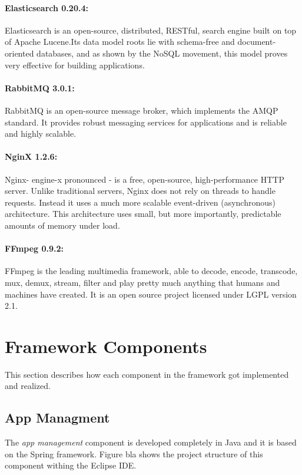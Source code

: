 \paragraph{Elasticsearch 0.20.4:} Elasticsearch is an open-source, distributed, RESTful, search engine built on top of Apache Lucene.Its data model roots lie with schema-free and document-oriented databases, and as shown by the NoSQL movement, this model proves very effective for building applications.

\paragraph{RabbitMQ 3.0.1:} RabbitMQ is an open-source message broker, which implements the AMQP standard. It provides  robust messaging services for applications and is reliable and highly scalable.

\paragraph{NginX 1.2.6:} Nginx- engine-x pronounced - is a free, open-source, high-performance HTTP server. Unlike traditional servers, Nginx does not rely on threads to handle requests. Instead it uses a much more scalable event-driven (asynchronous) architecture. This architecture uses small, but more importantly, predictable amounts of memory under load.

\paragraph{FFmpeg 0.9.2:} FFmpeg is the leading multimedia framework, able to decode, encode, transcode, mux, demux, stream, filter and play pretty much anything that humans and machines have created. It is an open source project licensed under LGPL version 2.1.

\section{Framework Components\label{sec:impl_used_op_sr}}
This section describes how each component in the framework got implemented and realized.

\subsection{App Managment\label{sec:impl_app_man}}
The \textit{app management} component is developed completely in Java and it is based on the Spring framework. Figure bla shows the project structure of this component withing the Eclipse IDE.

